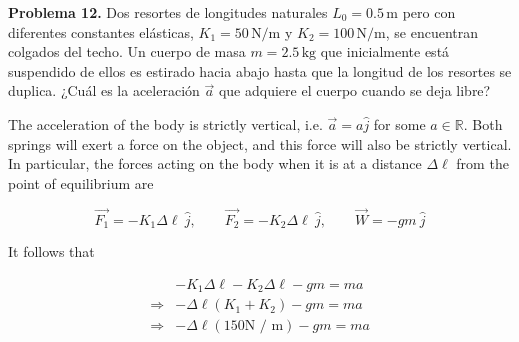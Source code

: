 \documentclass[12pt]{article}
\theoremstyle{definition}
\begin{document}
\begin{shaded}
\textbf{Problema 12.}  
Dos resortes de longitudes naturales $L_0 = 0.5 \, \text{m}$ pero con diferentes constantes 
elásticas, $K_1 = 50 \, \text{N/m}$ y $K_2 = 100 \, \text{N/m}$, se encuentran colgados del 
techo. Un cuerpo de masa $m = 2.5 \, \text{kg}$ que inicialmente está suspendido de ellos es 
estirado hacia abajo hasta que la longitud de los resortes se duplica. ¿Cuál es la aceleración 
$\vec{a}$ que adquiere el cuerpo cuando se deja libre? \\[1em]

\begin{center}
\end{center}
\end{shaded}

The acceleration of the body is strictly vertical, i.e. $\vec{a} = a \hat{j}$
for some $a \in \mathbb{R}$. Both springs will exert a force on the object, and
this force will also be strictly vertical. In particular, the forces acting on
the body when it is at a distance $\Delta \ell$ from the point of equilibrium
are 

\begin{equation*}
    \vec{F_1} = -K_1 \Delta \ell ~ \hat{j}, \qquad \vec{F_2} = -K_2 \Delta \ell
    ~ \hat{j}, \qquad \vec{W} =
    -gm ~ \hat{j}
\end{equation*}

It follows that 

\begin{align*}
    &-K_1 \Delta \ell - K_2 \Delta \ell - gm = ma \\ 
    \Rightarrow 
    &-\Delta \ell(K_1 + K_2) - gm = ma \\
    \Rightarrow 
    &-\Delta \ell(150 \text{N / m}) - gm = ma \\
\end{align*}
\end{document}
